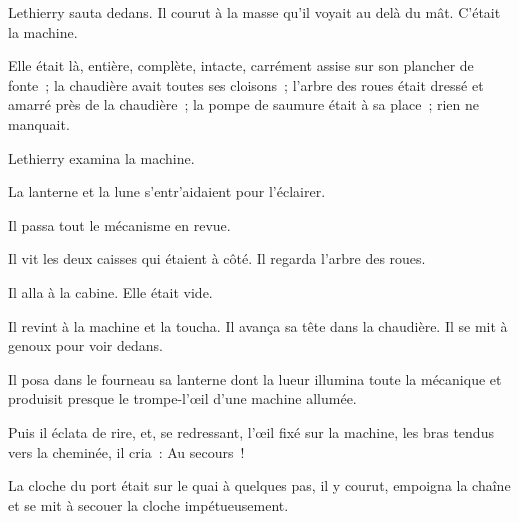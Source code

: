 \documentclass[french,twoside]{book} %
\begin{document}
Lethierry sauta dedans. Il courut à la masse qu’il voyait au delà du mât. C’était la machine.\par
Elle était là, entière, complète, intacte, carrément assise sur son plancher de fonte ; la chaudière avait toutes ses cloisons ; l’arbre des roues était dressé et amarré près de la chaudière ; la pompe de saumure était à sa place ; rien ne manquait.\par
Lethierry examina la machine.\par
La lanterne et la lune s’entr’aidaient pour l’éclairer.\par
Il passa tout le mécanisme en revue.\par
Il vit les deux caisses qui étaient à côté. Il regarda l’arbre des roues.\par
Il alla à la cabine. Elle était vide.\par
Il revint à la machine et la toucha. Il avança sa tête dans la chaudière. Il se mit à genoux pour voir dedans.\par
 Il posa dans le fourneau sa lanterne dont la lueur illumina toute la mécanique et produisit presque le trompe-l’œil d’une machine allumée.\par
Puis il éclata de rire, et, se redressant, l’œil fixé sur la machine, les bras tendus vers la cheminée, il cria : Au secours !\par
La cloche du port était sur le quai à quelques pas, il y courut, empoigna la chaîne et se mit à secouer la cloche impétueusement.
\end{document}

